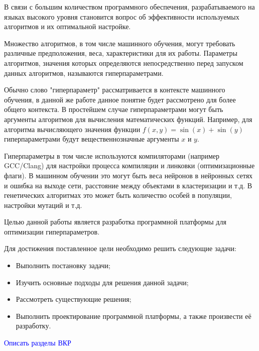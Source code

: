 

В связи с большим количеством программного обеспечения, разрабатываемого на языках высокого уровня становится вопрос об эффективности используемых алгоритмов и их оптимальной настройке.

Множество алгоритмов, в том числе машинного обучения, могут требовать различные предположения, веса, характеристики для их работы. Параметры алгоритмов, значения которых определяются непосредственно перед запуском данных алгоритмов, называются гиперпараметрами. 

Обычно слово "гиперпараметр" рассматривается в контексте машинного обучения, в данной же работе данное понятие будет рассмотрено для более общего контекста. В простейшем случае гиперпараметрами могут быть аргументы алгоритмов для вычисления математических функций. Например, для алгоритма вычисляющего значения функции $f(x, y) = \sin(x) + \sin(y)$ гиперпараметрами будут вещественнозначные аргументы $x$ и $y$.

 Гиперпараметры в том числе используются компиляторами (например GCC/Clang) для настройки процесса компиляции и линковки (оптимизационные флаги). В машинном обучении это могут быть веса нейронов в нейронных сетях и ошибка на выходе сети, расстояние между объектами в кластеризации и т.д. В генетических алгоритмах это может быть количество особей в популяции, настройки мутаций и т.д. 
 
 Целью данной работы является разработка программной платформы для оптимизации гиперпараметров. 
 
 Для достижения поставленное цели необходимо решить следующие задачи: 
 
 \begin{itemize}
 	\item Выполнить постановку задачи;
 	\item Изучить основные подходы для решения данной задачи;
 	\item Рассмотреть существующие решения;
 	\item Выполнить проектирование программной платформы, а также произвести её разработку. 
 \end{itemize}
 
 \textcolor{blue}{Описать разделы ВКР}


\clearpage